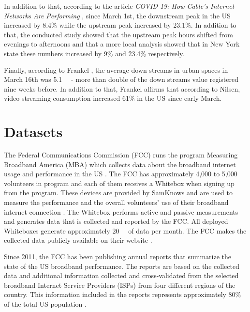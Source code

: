 \documentclass[conference,10pt]{IEEEtran}
\begin{document}
In addition to that, according to the article \textit{COVID-19: How Cable's Internet Networks Are Performing} \cite{ncta}, since March 1st, the downstream peak in the US increased by 8.4\% while the upstream peak increased by 23.1\%. In addition to that, the conducted study showed that the upstream peak hours shifted from evenings to afternoons and that a more local analysis showed that in New York state these numbers increased by 9\% and 23.4\% respectively.

Finally, according to Frankel \cite{frankel}, the average down streams in urban spaces in March 16th was \SI{5.1}{\giga\byte} - more than double of the down streams value registered nine weeks before. In addition to that, Frankel affirms that according to Nilsen, video streaming consumption increased 61\% in the US since early March.

\section{Datasets}
\label{sec:datasets}


The Federal Communications Commission (FCC) runs the program Measuring Broadband America (MBA) which collects data about the broadband internet usage and performance in the US \cite{mba}. The FCC has approximately 4,000 to 5,000 volunteers in program and each of them receives a Whitebox when signing up from the program. These devices are provided by SamKnows and are used to measure the performance and the overall volunteers' use of their broadband internet connection \cite{sam}. The Whitebox performs active and passive measurements and generates data that is collected and reported by the FCC. All deployed Whiteboxes generate approximately \SI{20}{\giga\byte} of data per month. The FCC makes the collected data publicly available on their website \cite{data}.

Since 2011, the FCC has been publishing annual reports that summarize the state of the US broadband performance. The reports are based on the collected data and additional information collected and cross-validated from the selected broadband Internet Service Providers (ISPs) from four different regions of the country. This information included in the reports represents approximately 80\% of the total US population \cite{mba-studies}.
\end{document}
